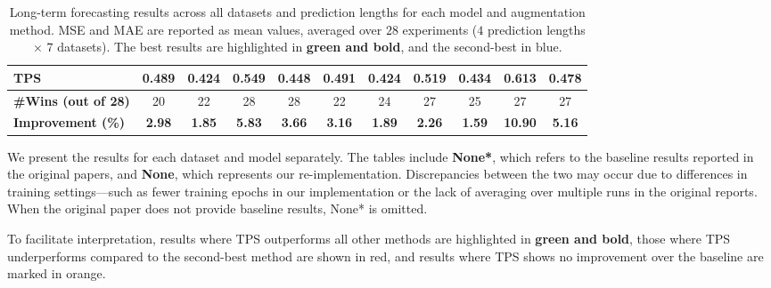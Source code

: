 \begin{table}[h!]
\begin{adjustbox}{max width=\textwidth}
\begin{tabular}{l|cc|cc|cc|cc|cc}
    TPS           & \cellcolor{bestcolor} \textbf{0.489} & \cellcolor{bestcolor} \textbf{0.424} & \cellcolor{bestcolor} \textbf{0.549} & \cellcolor{bestcolor} \textbf{0.448} & 
 \cellcolor{bestcolor}\textbf{0.491} & \cellcolor{bestcolor}\textbf{0.424} & \cellcolor{bestcolor} \textbf{0.519} & \cellcolor{bestcolor} \textbf{0.434} & \cellcolor{bestcolor} \textbf{0.613} & \cellcolor{bestcolor} \textbf{0.478} \\
    \midrule
    \textbf{\#Wins (out of 28)} & 20 & 22 & 28 & 28 & 22 & 24 & 27 & 25 & 27 & 27 \\
    \textbf{Improvement (\%)} & \cellcolor{bestcolor} \textbf{2.98} & \cellcolor{bestcolor} \textbf{1.85} & \cellcolor{bestcolor} \textbf{5.83} & \cellcolor{bestcolor} \textbf{3.66} & \cellcolor{bestcolor} \textbf{3.16} & \cellcolor{bestcolor} \textbf{1.89} & \cellcolor{bestcolor} \textbf{2.26} & \cellcolor{bestcolor} \textbf{1.59} & \cellcolor{bestcolor} \textbf{10.90} & \cellcolor{bestcolor} \textbf{5.16} \\
    \bottomrule
\end{tabular}
\end{adjustbox}
\caption{Long-term forecasting results across all datasets and prediction lengths for each model and augmentation method. MSE and MAE are reported as mean values, averaged over $28$ experiments ($4$ prediction lengths $\times$ $7$ datasets). The best results are highlighted in \textbf{green and bold}, and the second-best in blue.}
\label{tb:avg_model_results}
\end{table}



We present the results for each dataset and model separately. The tables include \textbf{None*}, which refers to the baseline results reported in the original papers, and \textbf{None}, which represents our re-implementation. Discrepancies between the two may occur due to differences in training settings—such as fewer training epochs in our implementation or the lack of averaging over multiple runs in the original reports. When the original paper does not provide baseline results, None* is omitted.

To facilitate interpretation, results where TPS outperforms all other methods are highlighted in \textbf{green and bold}, those where TPS underperforms compared to the second-best method are shown in red, and results where TPS shows no improvement over the baseline are marked in orange.


